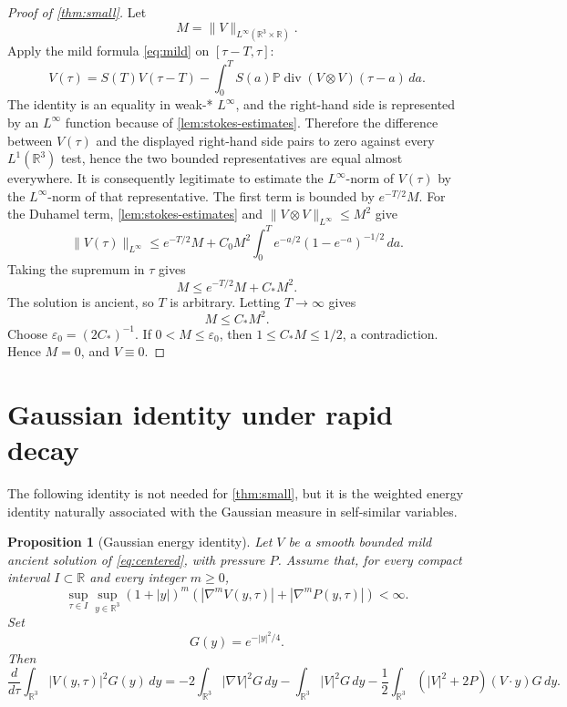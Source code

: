 \documentclass[11pt]{amsart}
\theoremstyle{plain}
\newtheorem{proposition}[theorem]{Proposition}
\theoremstyle{definition}
\theoremstyle{remark}
\numberwithin{equation}{section}
\begin{document}
\begin{proof}[Proof of \cref{thm:small}]
Let
\[
   M=\|V\|_{L^\infty(\mathbb R^3\times\mathbb R)}.
\]
Apply the mild formula \eqref{eq:mild} on \([\tau-T,\tau]\):
\[
   V(\tau)
   =
   S(T)V(\tau-T)
   -
   \int_0^T
   S(a)\mathbb P\operatorname{div}(V\otimes V)(\tau-a)\,da .
\]
The identity is an equality in weak-* \(L^\infty\), and the right-hand side is
represented by an \(L^\infty\) function because of
\cref{lem:stokes-estimates}.  Therefore the difference between \(V(\tau)\)
and the displayed right-hand side pairs to zero against every
\(L^1(\mathbb R^3)\) test, hence the two bounded representatives are equal
almost everywhere.  It is consequently legitimate to estimate the
\(L^\infty\)-norm of \(V(\tau)\) by the \(L^\infty\)-norm of that
representative.  The first term is bounded by \(e^{-T/2}M\).  For the Duhamel term,
\cref{lem:stokes-estimates} and \(\|V\otimes V\|_{L^\infty}\le M^2\) give
\[
   \|V(\tau)\|_{L^\infty}
   \le
   e^{-T/2}M
   +
   C_0M^2
   \int_0^T e^{-a/2}(1-e^{-a})^{-1/2}\,da .
\]
Taking the supremum in \(\tau\) gives
\[
   M\le e^{-T/2}M+C_*M^2.
\]
The solution is ancient, so \(T\) is arbitrary.  Letting \(T\to\infty\) gives
\[
   M\le C_*M^2.
\]
Choose \(\varepsilon_0=(2C_*)^{-1}\).  If \(0<M\le\varepsilon_0\), then
\(1\le C_*M\le1/2\), a contradiction.  Hence \(M=0\), and \(V\equiv0\).
\end{proof}

\section{Gaussian identity under rapid decay}

The following identity is not needed for \cref{thm:small}, but it is the
weighted energy identity naturally associated with the Gaussian measure in
self-similar variables.

\begin{proposition}[Gaussian energy identity]\label{prop:gaussian}
Let \(V\) be a smooth bounded mild ancient solution of \eqref{eq:centered},
with pressure \(P\).  Assume that, for every compact interval
\(I\subset\mathbb R\) and every integer \(m\ge0\),
\[
   \sup_{\tau\in I}\sup_{y\in\mathbb R^3}
   (1+|y|)^m\left(
   |\nabla^m V(y,\tau)|+|\nabla^m P(y,\tau)|
   \right)<\infty .
\]
Set
\[
   G(y)=e^{-|y|^2/4}.
\]
Then
\begin{equation}\label{eq:gaussian-identity}
   \frac{d}{d\tau}\int_{\mathbb R^3}|V(y,\tau)|^2G(y)\,dy
   =
   -2\int_{\mathbb R^3}|\nabla V|^2G\,dy
   -\int_{\mathbb R^3}|V|^2G\,dy
   -\frac12\int_{\mathbb R^3}(|V|^2+2P)(V\cdot y)G\,dy .
\end{equation}
\end{proposition}
\end{document}

